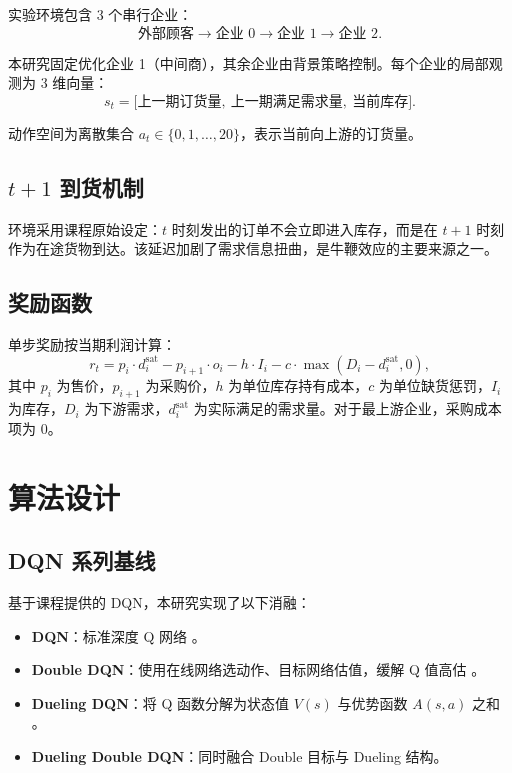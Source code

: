 \documentclass{article}
\begin{document}
实验环境包含 3 个串行企业：
\begin{equation}
  \text{外部顾客} \rightarrow \text{企业 0} \rightarrow \text{企业 1} \rightarrow \text{企业 2}.
\end{equation}

本研究固定优化企业 1（中间商），其余企业由背景策略控制。每个企业的局部观测为 3 维向量：
\begin{equation}
  s_t = \bigl[\text{上一期订货量},\ \text{上一期满足需求量},\ \text{当前库存}\bigr].
\end{equation}

动作空间为离散集合 $a_t \in \{0,1,\dots,20\}$，表示当前向上游的订货量。

\subsection{$t+1$ 到货机制}

环境采用课程原始设定：$t$ 时刻发出的订单不会立即进入库存，而是在 $t+1$ 时刻作为在途货物到达。该延迟加剧了需求信息扭曲，是牛鞭效应的主要来源之一。

\subsection{奖励函数}

单步奖励按当期利润计算：
\begin{equation}
  r_t = p_i \cdot d_i^{\text{sat}} - p_{i+1} \cdot o_i - h \cdot I_i - c \cdot \max(D_i - d_i^{\text{sat}}, 0),
\end{equation}
其中 $p_i$ 为售价，$p_{i+1}$ 为采购价，$h$ 为单位库存持有成本，$c$ 为单位缺货惩罚，$I_i$ 为库存，$D_i$ 为下游需求，$d_i^{\text{sat}}$ 为实际满足的需求量。对于最上游企业，采购成本项为 0。

\section{算法设计}

\subsection{DQN 系列基线}

基于课程提供的 DQN，本研究实现了以下消融：
\begin{itemize}[leftmargin=2em]
  \item \textbf{DQN}：标准深度 Q 网络 \citep{mnih2015human}。
  \item \textbf{Double DQN}：使用在线网络选动作、目标网络估值，缓解 Q 值高估 \citep{van2016deep}。
  \item \textbf{Dueling DQN}：将 Q 函数分解为状态值 $V(s)$ 与优势函数 $A(s,a)$ 之和 \citep{wang2016dueling}。
  \item \textbf{Dueling Double DQN}：同时融合 Double 目标与 Dueling 结构。
\end{itemize}
\end{document}
